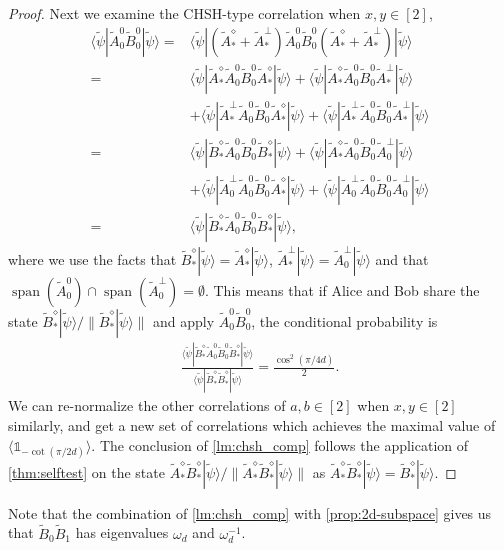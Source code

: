 \documentclass[11pt,letterpaper]{article}
\newcommand{\ket}[1]{|#1\rangle}
\newcommand{\bra}[1]{\langle#1|}
\DeclareMathOperator{\spn}{span}
\newcommand{\1}{\mathbb{1}}
\newcommand{\tA}{\tilde{A}}
\newcommand{\tB}{\tilde{B}}
\newcommand{\tpsi}{\tilde{\psi}}
\theoremstyle{definition}
\begin{document}
\begin{proof}
Next we examine the CHSH-type correlation when $x,y \in [2]$,
\begin{align*}
	   \bra{\tpsi} \tA_0^0\tB_0^0 \ket{\tpsi} 
	= &\bra{\tpsi}(\tA_\ast^\diamond + \tA_\ast^\perp) \tA_0^0\tB_0^0 (\tA_\ast^\diamond + \tA_\ast^\perp)\ket{\tpsi} \\
	= & \bra{\tpsi}\tA_\ast^\diamond \tA_0^0\tB_0^0 \tA_\ast^\diamond\ket{\tpsi} + \bra{\tpsi}\tA_\ast^\diamond \tA_0^0\tB_0^0 \tA_\ast^\perp\ket{\tpsi} \\
	&+\bra{\tpsi}\tA_\ast^\perp \tA_0^0\tB_0^0 \tA_\ast^\diamond\ket{\tpsi} + \bra{\tpsi}\tA_\ast^\perp \tA_0^0\tB_0^0 \tA_\ast^\perp\ket{\tpsi}\\
	= & \bra{\tpsi}\tB_\ast^\diamond \tA_0^0\tB_0^0 \tB_\ast^\diamond\ket{\tpsi} + \bra{\tpsi}\tA_\ast^\diamond \tA_0^0\tB_0^0 \tA_0^\perp\ket{\tpsi} \\
	&+\bra{\tpsi}\tA_0^\perp \tA_0^0\tB_0^0 \tA_\ast^\diamond\ket{\tpsi} + \bra{\tpsi}\tA_0^\perp \tA_0^0\tB_0^0 \tA_0^\perp\ket{\tpsi}\\
	=&\bra{\tpsi}\tB_\ast^\diamond \tA_0^0\tB_0^0 \tB_\ast^\diamond\ket{\tpsi},
\end{align*}
where we use the facts that $\tB_\ast^\diamond \ket{\tpsi} = \tA_\ast^\diamond \ket{\tpsi}$, $\tA_\ast^\perp \ket{\tpsi} = \tA_0^\perp \ket{\tpsi}$ and that 
$\spn(\tA_0^0) \cap \spn(\tA_0^\perp) = \emptyset$. 
This means that if Alice and Bob share the state $\tB_\ast^\diamond \ket{\tpsi}/\|\tB_\ast^\diamond \ket{\tpsi}\|$ and apply 
$\tA_0^0\tB_0^0$, the conditional probability is
\begin{align}
	\frac{\bra{\tpsi}\tB_\ast^\diamond \tA_0^0\tB_0^0 \tB_\ast^\diamond\ket{\tpsi}}{\bra{\tpsi} \tB_\ast^\diamond \tB_\ast^\diamond \ket{\tpsi}} = \frac{\cos^2(\pi/4d)}{2}.
\end{align} 
We can re-normalize the other correlations of $a,b \in [2]$ when $x,y \in [2]$ similarly, and get a new set of correlations 
which achieves the maximal value of $\langle \1_{-\cot(\pi/2d)}\rangle$. 
The conclusion of \cref{lm:chsh_comp} follows the application of \cref{thm:selftest} on the state $\tA_\ast^\diamond\tB_\ast^\diamond \ket{\tpsi}/\|\tA_\ast^\diamond\tB_\ast^\diamond \ket{\tpsi}\|$ as $\tA_\ast^\diamond\tB_\ast^\diamond \ket{\tpsi} = \tB_\ast^\diamond \ket{\tpsi}$.
\end{proof}
Note that the combination of \cref{lm:chsh_comp} with \cref{prop:2d-subspace} gives us that 
$\tB_0\tB_1$ has eigenvalues $\omega_d$ and $\omega_d^{-1}$.

\end{document}
